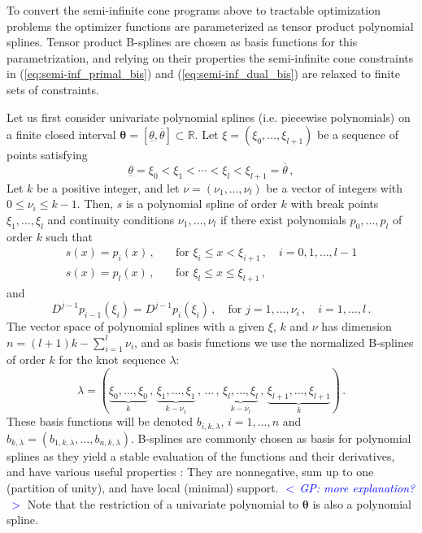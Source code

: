\documentclass{article}
\newcommand{\commentGP}[1]{\noindent \textcolor{blue}{\emph{$<\,$GP: #1$\,>$}}}%
\newcommand{\R}{\mathbb{R}}         %
\newcommand{\ppar}{\theta}                          %
\newcommand{\Ppar}{{\bm{\theta}}}                   %
\newcommand{\pparL}{\underline{\ppar}}
\newcommand{\pparU}{\overline{\ppar}}
\begin{document}
To convert the semi-infinite cone programs above to tractable optimization problems the optimizer functions are parameterized as tensor product polynomial splines. Tensor product B-splines are chosen as basis functions for this parametrization, and relying on their properties the semi-infinite cone constraints in (\ref{eq:semi-inf_primal_bis}) and (\ref{eq:semi-inf_dual_bis}) are relaxed to finite sets of constraints.

Let us first consider univariate polynomial splines (i.e. piecewise polynomials) on a finite closed interval $\Ppar=[\pparL,\pparU]\subset\R$. Let $\xi = (\xi_0, \ldots, \xi_{l+1})$ be a sequence of points satisfying
\[ \pparL = \xi_0 < \xi_1 < \cdots < \xi_{l} < \xi_{l+1} = \pparU \,,
\]
Let $k$ be a positive integer, and let $\nu=(\nu_1,\ldots,\nu_l)$ be a vector of integers with $0\leq \nu_i\leq k-1$. Then, $s$ is a polynomial spline of order $k$ with break points $\xi_1,\ldots,\xi_l$ and continuity conditions $\nu_1,\ldots,\nu_l$ if there exist polynomials $p_0, \ldots, p_l$ of order $k$ such that
\begin{align*}
s(x) = p_i(x)\,,\quad &\text{for~} \xi_i \leq x<\xi_{i+1}\,,\quad i = 0,1,\ldots,l-1\\%
s(x) = p_l(x)\,,\quad &\text{for~} \xi_l \leq x\leq\xi_{l+1}\,,  %
\end{align*}
and
\[ D^{j-1} p_{i-1}(\xi_i) = D^{j-1} p_i(\xi_i) \,,\quad \text{for~} j = 1, \ldots, \nu_i\,,\quad i = 1,\ldots,l\,.%
\]
The vector space of polynomial splines with a given $\xi$, $k$ and $\nu$ has dimension $n = (l+1)k-\sum_{i=1}^l \nu_i$, and as basis functions we use the normalized B-splines of order $k$ for the knot sequence $\lambda$:
\[ \lambda = (\underbrace{\xi_0, \ldots, \xi_0}_k \,,\, \underbrace{\xi_1,\ldots,\xi_1}_{k-\nu_1} \,,\, \ldots \,,\, \underbrace{\xi_l,\ldots,\xi_l}_{k-\nu_l} \,,\, \underbrace{\xi_{l+1},\ldots,\xi_{l+1}}_{k})\,.%
\]
These basis functions will be denoted $b_{i,k,\lambda}$, $i=1,\ldots, n$ and $b_{k,\lambda} = (b_{1,k,\lambda},\ldots,b_{n,k,\lambda})$. B-splines are commonly chosen as basis for polynomial splines as they yield a stable evaluation of the functions and their derivatives, and have various useful properties \cite{deBoor_2001,Schumaker_2007}: They are nonnegative, sum up to one (partition of unity), and have local (minimal) support. \commentGP{more explanation?} Note that the restriction of a univariate polynomial to $\Ppar$ is also a polynomial spline.
\end{document}
